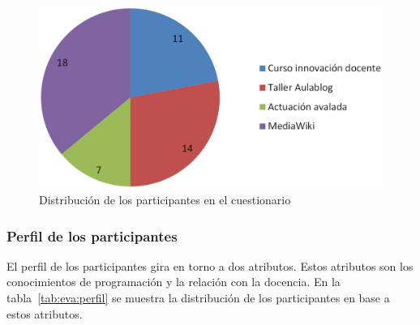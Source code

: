 \begin{figure}
  \begin{center}
    \includegraphics[scale=0.3]{ResultadosParticipantes.png}
  \end{center}
  \caption{Distribución de los participantes en el cuestionario}
  \label{fig:ResultadosParticipantes}
\end{figure}

\subsubsection{Perfil de los participantes}

El perfil de los participantes gira en torno a dos atributos. Estos atributos son los conocimientos de programación y la relación con la docencia. En la tabla~\ref{tab:eva:perfil} se muestra la distribución de los participantes en base a estos atributos.

